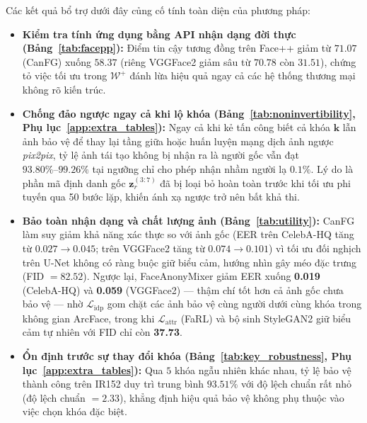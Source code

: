 Các kết quả bổ trợ dưới đây củng cố tính toàn diện của phương pháp:
\begin{itemize}
    \item \textbf{Kiểm tra tính ứng dụng bằng API nhận dạng đời thực (Bảng~\ref{tab:facepp}):} Điểm tin cậy tương đồng trên Face++ giảm từ $71.07$ (CanFG) xuống $58.37$ (riêng VGGFace2 giảm sâu từ $70.78$ còn $31.51$), chứng tỏ việc tối ưu trong $\mathcal{W}^+$ đánh lừa hiệu quả ngay cả các hệ thống thương mại không rõ kiến trúc.
    \item \textbf{Chống đảo ngược ngay cả khi lộ khóa (Bảng~\ref{tab:noninvertibility}, Phụ lục~\ref{app:extra_tables}):} Ngay cả khi kẻ tấn công biết cả khóa $\mathbf{k}$ lẫn ảnh bảo vệ để thay lại tầng giữa hoặc huấn luyện mạng dịch ảnh ngược \textit{pix2pix}, tỷ lệ ảnh tái tạo không bị nhận ra là người gốc vẫn đạt $93.80\%\text{--}99.26\%$ tại ngưỡng chỉ cho phép nhận nhầm người lạ $0.1\%$. Lý do là phần mã định danh gốc $\mathbf{z}_r^{(3:7)}$ đã bị loại bỏ hoàn toàn trước khi tối ưu phi tuyến qua 50 bước lặp, khiến ánh xạ ngược trở nên bất khả thi.
    \item \textbf{Bảo toàn nhận dạng và chất lượng ảnh (Bảng~\ref{tab:utility}):} CanFG làm suy giảm khả năng xác thực so với ảnh gốc (EER trên CelebA-HQ tăng từ $0.027 \rightarrow 0.045$; trên VGGFace2 tăng từ $0.074 \rightarrow 0.101$) vì tối ưu đối nghịch trên U-Net không có ràng buộc giữ biểu cảm, hướng nhìn gây méo đặc trưng (FID $= 82.52$). Ngược lại, FaceAnonyMixer giảm EER xuống \textbf{0.019} (CelebA-HQ) và \textbf{0.059} (VGGFace2) --- thậm chí tốt hơn cả ảnh gốc chưa bảo vệ --- nhờ $\mathcal{L}_{\text{idp}}$ gom chặt các ảnh bảo vệ cùng người dưới cùng khóa trong không gian ArcFace, trong khi $\mathcal{L}_{\text{attr}}$ (FaRL) và bộ sinh StyleGAN2 giữ biểu cảm tự nhiên với FID chỉ còn \textbf{37.73}.
    \item \textbf{Ổn định trước sự thay đổi khóa (Bảng~\ref{tab:key_robustness}, Phụ lục~\ref{app:extra_tables}):} Qua $5$ khóa ngẫu nhiên khác nhau, tỷ lệ bảo vệ thành công trên IR152 duy trì trung bình $93.51\%$ với độ lệch chuẩn rất nhỏ (độ lệch chuẩn $= 2.33$), khẳng định hiệu quả bảo vệ không phụ thuộc vào việc chọn khóa đặc biệt.
\end{itemize}